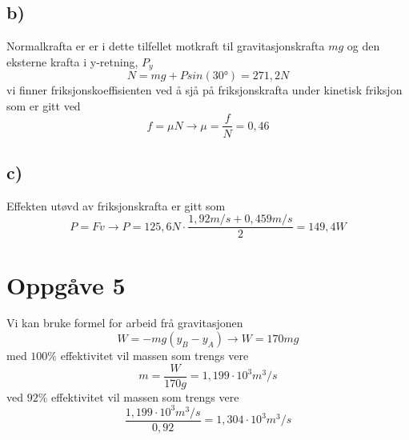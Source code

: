 \documentclass[12pt,a4paper]{article}
\begin{document}
    \subsection*{b)}
    Normalkrafta er er i dette tilfellet motkraft til gravitasjonskrafta $mg$ og
    den eksterne krafta i y-retning, $P_y$
    \begin{equation}
      N = mg + Psin(\ang{30}) = 271,2N
    \end{equation}
    vi finner friksjonskoeffisienten ved å sjå på friksjonskrafta under kinetisk friksjon
    som er gitt ved
    \begin{equation}
      f=\mu N \rightarrow \mu = \frac{f}{N} = 0,46
    \end{equation}

    \subsection*{c)}
    Effekten utøvd av friksjonskrafta er gitt som
    \begin{equation}
      P=Fv \rightarrow P = 125,6N \cdot \frac{1,92m/s + 0,459m/s}{2} = 149,4 W
    \end{equation}


  \section*{Oppgåve 5}
    Vi kan bruke formel for arbeid frå gravitasjonen
    \begin{equation}
      W = -mg(y_B - y_A) \rightarrow W = 170mg
    \end{equation}
    med $100\%$ effektivitet vil massen som trengs vere
    \begin{equation}
      m = \frac{W}{170g} = 1,199 \cdot 10^3 m^3/s
    \end{equation}
    ved $92\%$ effektivitet vil massen som trengs vere
    \begin{equation}
      \frac{1,199 \cdot 10^3 m^3/s}{0,92} = 1,304 \cdot 10^3m^3/s
    \end{equation}
\end{document}
